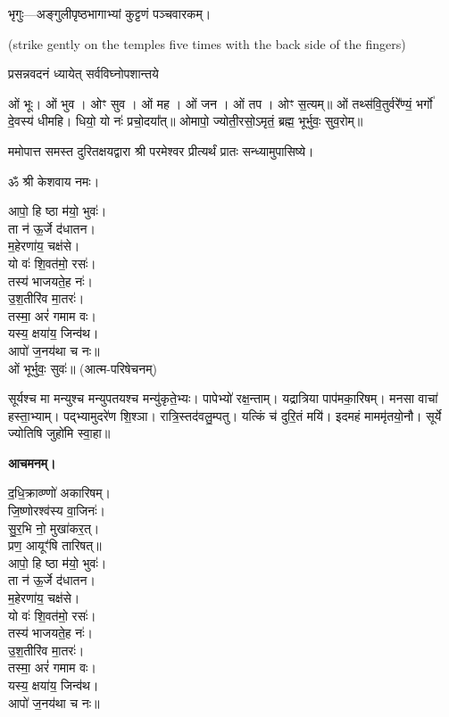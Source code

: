 
भृगुः—अङ्गुलीपृष्ठभागाभ्यां कुट्टणं पञ्चवारकम्।

{\scriptsize (strike gently on the temples five times with the back side of the fingers)}

{प्रसन्नवदनं ध्यायेत् सर्वविघ्नोपशान्तये}


ओं भूः। ओं भुव। ओꣳ सुव। ओं मह। ओं जन। ओं तप। ओꣳ स॒त्यम्॥
ओं तथ्स॑वि॒तुर्वरे᳚ण्यं॒ भर्गो॑ दे॒वस्य॑ धीमहि। धियो॒ यो नः॑ प्रचो॒दया᳚त्॥
ओमापो॒ ज्योती॒रसो॒ऽमृतं॒ ब्रह्म॒ भूर्भुवः॒ सुव॒रोम्॥


ममोपात्त समस्त दुरितक्षयद्वारा श्री परमेश्वर प्रीत्यर्थं प्रातः सन्ध्यामुपासिष्ये।


ॐ श्री केशवाय नमः।

आपो॒ हि ष्ठा म॑यो॒ भुवः॑।\\
ता न॑ ऊ॒र्जे द॑धातन।\\
म॒हेरणा॑य॒ चक्ष॑से।\\
यो वः॑ शि॒वत॑मो॒ रसः॑।\\
तस्य॑ भाजयते॒ह नः॑।\\
उ॒श॒तीरि॑व मा॒तरः॑।\\
तस्मा॒ अरं॑ गमाम वः।\\
यस्य॒ क्षया॑य॒ जिन्व॑थ।\\
आपो॑ ज॒नय॑था च नः॥\\

ओं भूर्भुवः॒ सुवः॑॥ (आत्म-परिषेचनम्)



सूर्यश्च मा मन्युश्च मन्युपतयश्च मन्यु॑कृते॒भ्यः। पापेभ्यो॑ रक्ष॒न्ताम्। यद्रात्रिया पाप॑मका॒रिषम्। मनसा वाचा॑ हस्ता॒भ्याम्। पद्भ्यामुदरे॑ण शि॒श्ञा। रात्रि॒स्तद॑वलु॒म्पतु। यत्किं च॑ दुरि॒तं मयि॑। इदमहं माममृ॑तयो॒नौ। सूर्ये ज्योतिषि जुहो॑मि स्वा॒हा॥


\textbf{आचमनम्।}

द॒धि॒क्राव्ण्णो॑ अकारिषम्।\\
 जि॒ष्णोरश्व॑स्य वा॒जिनः॑।\\
सु॒र॒भि नो॒ मुखा॑कर॒त्।\\
प्रण॒ आयूꣳ॑षि तारिषत्॥\\



आपो॒ हि ष्ठा म॑यो॒ भुवः॑।\\
ता न॑ ऊ॒र्जे द॑धातन।\\
म॒हेरणा॑य॒ चक्ष॑से।\\
यो वः॑ शि॒वत॑मो॒ रसः॑।\\
तस्य॑ भाजयते॒ह नः॑।\\
उ॒श॒तीरि॑व मा॒तरः॑।\\
तस्मा॒ अरं॑ गमाम वः।\\
यस्य॒ क्षया॑य॒ जिन्व॑थ।\\
आपो॑ ज॒नय॑था च नः॥\\

